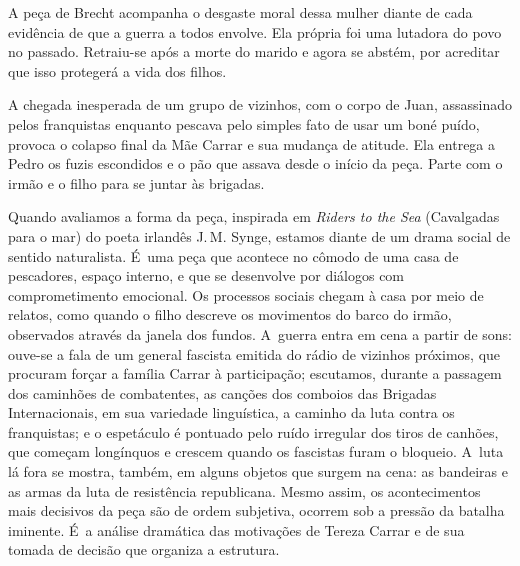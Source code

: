 A peça de Brecht acompanha o desgaste moral dessa mulher diante de cada
evidência de que a guerra a todos envolve. Ela própria foi uma lutadora
do povo no passado. Retraiu-se após a morte do marido e agora se abstém,
por acreditar que isso protegerá a vida dos filhos.

A chegada inesperada de um grupo de vizinhos, com o corpo de Juan,
assassinado pelos franquistas enquanto pescava pelo simples fato de
usar um boné puído, provoca o colapso final da Mãe Carrar e sua mudança
de atitude. Ela entrega a Pedro os fuzis escondidos e o pão que assava
desde o início da peça. Parte com o irmão e o filho para se juntar às
brigadas.

Quando avaliamos a forma da peça, inspirada em {\it Riders to the Sea}
(Cavalgadas para o mar) do poeta irlandês J.\,M. Synge, estamos
diante de um drama social de sentido naturalista. É~uma peça que
acontece no cômodo de uma casa de pescadores, espaço interno, e que se
desenvolve por diálogos com comprometimento emocional. Os processos
sociais chegam à casa por meio de relatos, como quando o filho descreve
os movimentos do barco do irmão, observados através da janela dos
fundos. A~guerra entra em cena a partir de sons: ouve-se a fala de um
general fascista emitida do rádio de vizinhos próximos, que procuram
forçar a família Carrar à participação; escutamos, durante a passagem
dos caminhões de combatentes, as canções dos comboios das Brigadas
Internacionais, em sua variedade linguística, a caminho da luta contra
os franquistas; e o espetáculo é pontuado pelo ruído irregular dos tiros
de canhões, que começam longínquos e crescem quando os fascistas furam o
bloqueio. A~luta lá fora se mostra, também, em alguns objetos que surgem
na cena: as bandeiras e as armas da luta de resistência republicana.
Mesmo assim, os acontecimentos mais decisivos da peça são de ordem
subjetiva, ocorrem sob a pressão da batalha iminente. É~a análise
dramática das motivações de Tereza Carrar e de sua tomada de decisão que
organiza a estrutura.

